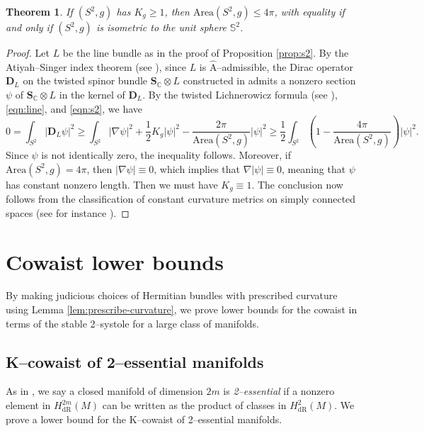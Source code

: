 \documentclass[12pt]{amsart}
\newtheorem{theorem}{Theorem}[section]
\theoremstyle{definition}
\numberwithin{equation}{section}
\newcommand{\C}{\mathbb{C}}
\newcommand{\ahat}{\hat{\mathrm{A}}}
\begin{document}
\begin{theorem}
If $(S^2, g)$ has $K_g \geq 1$, then $\mathrm{Area}(S^2, g) \leq 4\pi$, with equality if and only if $(S^2, g)$ is isometric to the unit sphere $\mathbb{S}^2$.
\end{theorem}
\begin{proof}
Let $L$ be the line bundle as in the proof of Proposition \ref{prop:s2}. By the Atiyah--Singer index theorem (see \cite[Chapter III, Theorem 13.10]{Lawson-Michelson:spin}), since $L$ is $\ahat$--admissible, the Dirac operator $\mathbf{D}_L$ on the twisted spinor bundle $\mathbf{S}_{\C} \otimes L$ constructed in \cite[Chapter II, Proposition 5.10]{Lawson-Michelson:spin} admits a nonzero section $\psi$ of $\mathbf{S}_{\C} \otimes L$ in the kernel of $\mathbf{D}_L$. By the twisted Lichnerowicz formula (see \cite[Chapter II, Theorem 8.17]{Lawson-Michelson:spin}), \eqref{eqn:line}, and \eqref{eqn:s2}, we have
\[ 0 = \int_{S^2} |\mathbf{D}_L\psi|^2 \geq \int_{S^2} |\nabla \psi|^2 + \frac{1}{2}K_g|\psi|^2 - \frac{2\pi}{\mathrm{Area}(S^2, g)}|\psi|^2 \geq \frac{1}{2}\int_{S^2} \left(1 - \frac{4\pi}{\mathrm{Area}(S^2, g)}\right)|\psi|^2. \]
Since $\psi$ is not identically zero, the inequality follows. Moreover, if $\mathrm{Area}(S^2, g) = 4\pi$, then $|\nabla \psi| \equiv 0$, which implies that $\nabla |\psi| \equiv 0$, meaning that $\psi$ has constant nonzero length. Then we must have $K_g \equiv 1$. The conclusion now follows from the classification of constant curvature metrics on simply connected spaces (see for instance \cite[Corollary 5.6.14]{Petersen:geometry}).
\end{proof}



\section{Cowaist lower bounds}\label{sec:cw}
By making judicious choices of Hermitian bundles with prescribed curvature using Lemma \ref{lem:prescribe-curvature}, we prove lower bounds for the cowaist in terms of the stable 2--systole for a large class of manifolds.

\subsection{K--cowaist of 2--essential manifolds}\label{sec:cw-2-ess}

As in \cite{GHK:systole}, we say a closed manifold of dimension $2m$ is \emph{2--essential} if a nonzero element in $H^{2m}_{\mathrm{dR}}(M)$ can be written as the product of classes in $H^2_{\mathrm{dR}}(M)$. We prove a lower bound for the K--cowaist of 2--essential manifolds.
\end{document}
